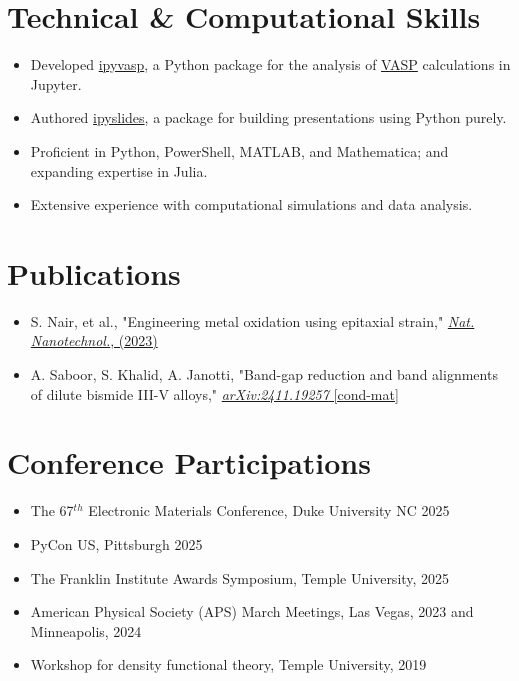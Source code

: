 \documentclass[letter,11pt]{article}
\begin{document}
\section{Technical \& Computational Skills}
\begin{itemize}
\item Developed \href{https://github.com/asaboor-gh/ipyvasp}{ipyvasp}, a Python package for the analysis of \href{https://en.wikipedia.org/wiki/Vienna_Ab_initio_Simulation_Package}{VASP} calculations in Jupyter.
\item Authored \href{https://github.com/asaboor-gh/ipyslides}{ipyslides}, a package for building presentations using Python purely.
\item Proficient in Python, PowerShell, MATLAB, and Mathematica; and expanding expertise in Julia.
\item Extensive experience with computational simulations and data analysis.
\end{itemize}

\section{Publications}
\begin{itemize}
    \item S. Nair, et al., "Engineering metal oxidation using epitaxial strain," \href{https://www.nature.com/articles/s41565-023-01397-0}{\textit{Nat. Nanotechnol.}, (2023)}
    \item A. Saboor, S. Khalid, A. Janotti, "Band-gap reduction and band alignments of dilute bismide III-V alloys," \href{https://arxiv.org/abs/2411.19257}{\textit{arXiv:2411.19257} [cond-mat]}

\end{itemize}

\section{Conference Participations}
\begin{itemize}
\item The 67$^{th}$ Electronic Materials Conference, Duke University NC 2025
\item PyCon US, Pittsburgh 2025
\item The Franklin Institute Awards Symposium, Temple University, 2025
\item American Physical Society (APS) March Meetings, Las Vegas, 2023 and Minneapolis, 2024
\item Workshop for density functional theory, Temple University, 2019
\end{itemize}
\end{document}
